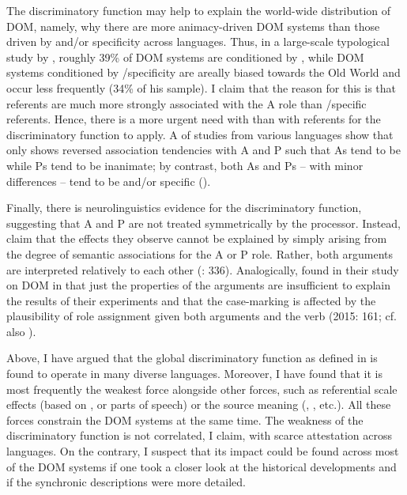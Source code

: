 \documentclass[output=paper]{langsci/langscibook}
\begin{document}
The discriminatory function may help to explain the world-wide distribution of DOM, namely, why there are more animacy-driven DOM systems than those driven by  and/or specificity across languages. Thus, in a large-scale typological study by \citet[295]{Sinnemäki2014}, roughly 39\% of DOM systems are conditioned by , while DOM systems conditioned by /specificity are areally biased towards the Old World and occur less frequently (34\% of his sample). I claim that the reason for this is that  referents are much more strongly associated with the A role than /specific referents. Hence, there is a more urgent need with  than with  referents for the discriminatory function to apply. A  of  studies from various languages show that only  shows reversed association tendencies with A and P such that As tend to be  while Ps tend to be inanimate; by contrast, both As and Ps – with minor differences – tend to be  and/or specific (\citealt{Dahl2000,Hofling2003,Everett2009,FauconnierVerstraete2014}). 

Finally, there is neurolinguistics evidence for the discriminatory function, suggesting that A and P are not treated symmetrically by the processor. Instead, \citet{Bornkessel-SchlesewskySchlesewsky2015} claim that the effects they observe cannot be explained by simply arising from the degree of semantic associations for the A or P role. Rather, both arguments are interpreted relatively to each other (\citealt{Bornkessel-SchlesewskySchlesewsky2015}: 336). Analogically, \citet{KurumadaJaeger2015} found in their  study on DOM in  that just the properties of the arguments are insufficient to explain the results of their experiments and that the case-marking is affected by the plausibility of role assignment given both arguments and the verb (2015: 161; cf. also \citealt{AhnCho2007,FedzechkinaEtAl2012}).

Above, I have argued that the global discriminatory function as defined in  is found to operate in many diverse languages. Moreover, I have found that it is most frequently the weakest force alongside other forces, such as referential scale effects (based on ,  or parts of speech) or the source meaning (, , etc.). All these forces constrain the DOM systems at the same time. The weakness of the discriminatory function is not correlated, I claim, with scarce attestation across languages. On the contrary, I suspect that its impact could be found across most of the DOM systems if one took a closer look at the historical developments and if the synchronic descriptions were more detailed. 
\end{document}
